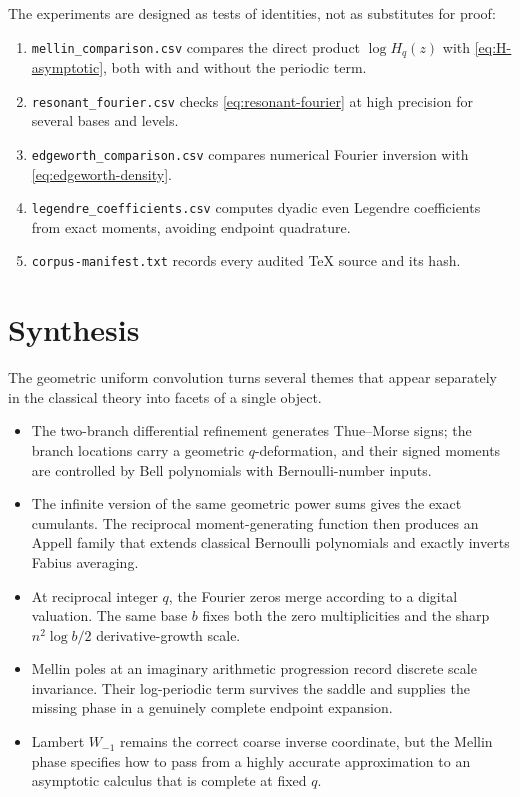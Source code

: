 \documentclass[11pt,oneside]{article}
\theoremstyle{definition}
\theoremstyle{remark}
\begin{document}
The experiments are designed as tests of identities, not as substitutes for proof:
\begin{enumerate}[label=(\arabic*)]
\item \texttt{mellin\_comparison.csv} compares the direct product
$\log H_q(z)$ with \eqref{eq:H-asymptotic}, both with and without the periodic term.
\item \texttt{resonant\_fourier.csv} checks \eqref{eq:resonant-fourier} at high
precision for several bases and levels.
\item \texttt{edgeworth\_comparison.csv} compares numerical Fourier inversion with
\eqref{eq:edgeworth-density}.
\item \texttt{legendre\_coefficients.csv} computes dyadic even Legendre coefficients
from exact moments, avoiding endpoint quadrature.
\item \texttt{corpus-manifest.txt} records every audited TeX source and its hash.
\end{enumerate}


\section{Synthesis}

The geometric uniform convolution turns several themes that appear separately in the
classical theory into facets of a single object.
\begin{itemize}
\item The two-branch differential refinement generates Thue--Morse signs; the branch
locations carry a geometric $q$-deformation, and their signed moments are controlled by
Bell polynomials with Bernoulli-number inputs.
\item The infinite version of the same geometric power sums gives the exact cumulants.
The reciprocal moment-generating function then produces an Appell family that extends
classical Bernoulli polynomials and exactly inverts Fabius averaging.
\item At reciprocal integer $q$, the Fourier zeros merge according to a digital
valuation.  The same base $b$ fixes both the zero multiplicities and the sharp
$n^2\log b/2$ derivative-growth scale.
\item Mellin poles at an imaginary arithmetic progression record discrete scale
invariance.  Their log-periodic term survives the saddle and supplies the missing phase
in a genuinely complete endpoint expansion.
\item Lambert $W_{-1}$ remains the correct coarse inverse coordinate, but the Mellin
phase specifies how to pass from a highly accurate approximation to an asymptotic
calculus that is complete at fixed $q$.
\end{itemize}
\end{document}
